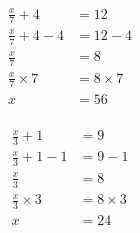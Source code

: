 \documentclass[12pt]{article}
\newcounter{minipagecount}
\begin{document}
\begin{multicols}{2}
\begin{minipage}[t]{0.45\textwidth}
    \vspace{-26pt}  %
    \raggedright %
    \begin{align*} %
        \frac{x}{7} + 4 &= 12\\
        \frac{x}{7} + 4 - 4 &= 12 - 4\\
        \frac{x}{7} &= 8\\
        \frac{x}{7} \times7 &= 8 \times7\\
        x &= 56\\
    \end{align*}
\end{minipage}\newpage
\noindent{(\theminipagecount)}\hspace{0.1mm} %
\begin{minipage}[t]{0.45\textwidth} %
    \vspace{-26pt}  %
    \raggedright %
    \begin{align*} %
        \frac{x}{3} + 1 &= 9\\
        \frac{x}{3} + 1 - 1 &= 9 - 1\\
        \frac{x}{3} &= 8\\
        \frac{x}{3} \times3 &= 8 \times3\\
        x &= 24\\
    \end{align*}
\end{minipage} %
\noindent{(\theminipagecount)}\hspace{0.1mm} %

\end{multicols}
\end{document}
